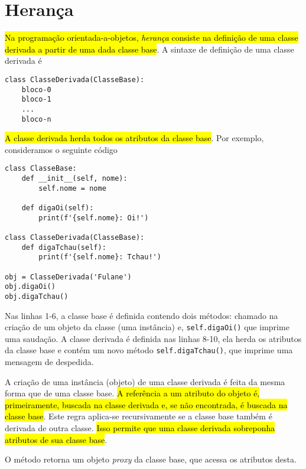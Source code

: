   

\section{Herança}\label{cap_oo_sec_her}

\hl{Na programação orientada-a-objetos, \emph{herança} consiste na definição de uma classe derivada a partir de uma dada classe base}. A sintaxe de definição de uma classe derivada é

\begin{lstlisting}
class ClasseDerivada(ClasseBase):
    bloco-0
    bloco-1
    ...
    bloco-n
\end{lstlisting}

\hl{A classe derivada herda todos os atributos da classe base}. Por exemplo, consideramos o seguinte código

\ifisbook
\newpage
\fi
\begin{lstlisting}
class ClasseBase:
    def __init__(self, nome):
        self.nome = nome
        
    def digaOi(self):
        print(f'{self.nome}: Oi!')

class ClasseDerivada(ClasseBase):
    def digaTchau(self):
        print(f'{self.nome}: Tchau!')

obj = ClasseDerivada('Fulane')
obj.digaOi()
obj.digaTchau()
\end{lstlisting}

Nas linhas 1-6, a classe base é definida contendo dois métodos: {\PYTHONobjectDOTinit} chamado na criação de um objeto da classe (uma instância) e, \lstinline+self.digaOi()+ que imprime uma saudação. A classe derivada é definida nas linhas 8-10, ela herda os atributos da classe base e contém um novo método \lstinline+self.digaTchau()+, que imprime uma mensagem de despedida.

A criação de uma instância (objeto) de uma classe derivada é feita da mesma forma que de uma classe base. \hl{A referência a um atributo do objeto é, primeiramente, buscada na classe derivada e, se não encontrada, é buscada na classe base}. Este regra aplica-se recursivamente se a classe base também é derivada de outra classe. \hl{Isso permite que uma classe derivada sobreponha atributos de sua classe base}.

\begin{obs}
O método {\PYTHONsuper} retorna um objeto \textit{proxy} da classe base, que acessa os atributos desta.
\end{obs}

